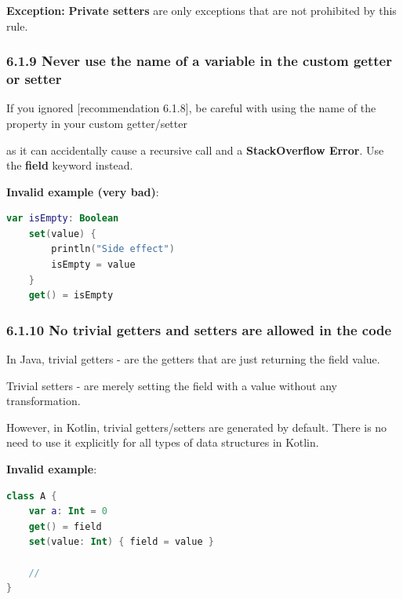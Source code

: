 \textbf{Exception:} \textbf{Private setters} are only exceptions that are not prohibited by this rule.



\subsubsection*{\textbf{6.1.9 Never use the name of a variable in the custom getter or setter}}
\leavevmode\newline

\label{sec:6.1.9}

If you ignored [recommendation 6.1.8], be careful with using the name of the property in your custom getter/setter

as it can accidentally cause a recursive call and a \textbf{StackOverflow Error}. Use the \textbf{field} keyword instead.



\textbf{Invalid example (very bad)}:

\begin{lstlisting}[language=Kotlin]
var isEmpty: Boolean
    set(value) {
        println("Side effect")
        isEmpty = value
    }
    get() = isEmpty
\end{lstlisting}


\subsubsection*{\textbf{6.1.10 No trivial getters and setters are allowed in the code}}
\leavevmode\newline

\label{sec:6.1.10}

In Java, trivial getters - are the getters that are just returning the field value.

Trivial setters - are merely setting the field with a value without any transformation.

However, in Kotlin, trivial getters/setters are generated by default. There is no need to use it explicitly for all types of data structures in Kotlin.



\textbf{Invalid example}:

\begin{lstlisting}[language=Kotlin]
class A {
    var a: Int = 0 
    get() = field
    set(value: Int) { field = value }

    //
}
\end{lstlisting}


